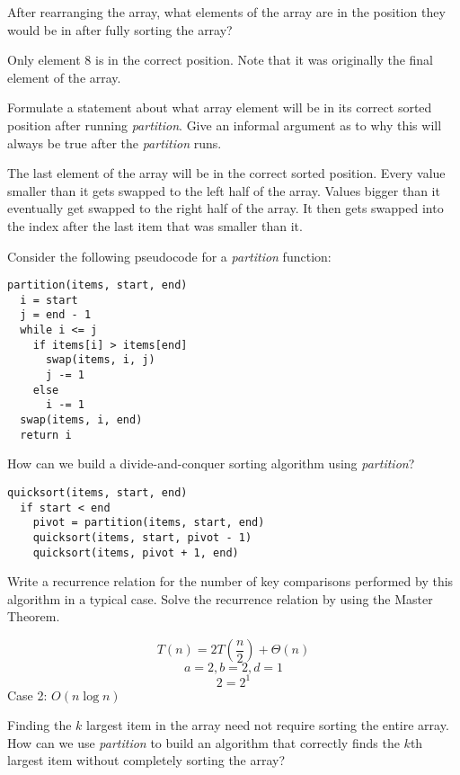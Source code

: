 \documentclass{tufte-handout}
\begin{document}
\begin{questions}
\item After rearranging the array, what elements of the array are in the position they would be in after fully sorting the array?

{\color{red} Only element 8 is in the correct position. Note that it was originally the final element of the array.}

\item Formulate a statement about what array element will be in its correct sorted position after running \emph{partition}. Give an informal argument as to why this will always be true after the \emph{partition} runs.

{\color{red} The last element of the array will be in the correct sorted position. Every value smaller than it gets swapped to the left half of the array. Values bigger than it eventually get swapped to the right half of the array. It then gets swapped into the index after the last item that was smaller than it.}

\item Consider the following pseudocode for a \emph{partition} function:
\begin{verbatim}
partition(items, start, end)
  i = start
  j = end - 1
  while i <= j
    if items[i] > items[end]
      swap(items, i, j)
      j -= 1
    else
      i -= 1
  swap(items, i, end)
  return i
\end{verbatim}

How can we build a divide-and-conquer sorting algorithm using \emph{partition}? 

{\color{red} 
\begin{verbatim}
quicksort(items, start, end)
  if start < end
    pivot = partition(items, start, end)
    quicksort(items, start, pivot - 1)
    quicksort(items, pivot + 1, end)
\end{verbatim}
}

\item Write a recurrence relation for the number of key comparisons performed by this algorithm in a typical case. Solve the recurrence relation by using the Master Theorem.

{\color{red} 
\[ T(n) = 2 T(\frac{n}{2}) + \Theta(n) \]
\[a = 2, b = 2, d = 1\] 
\[2 = 2^1\]
Case 2: $O(n \log n)$
}

\item Finding the $k$ largest item in the array need not require sorting the entire array. How can we use \emph{partition} to build an algorithm that correctly finds the $k$th largest item without completely sorting the array?


\end{questions}
\end{document}
